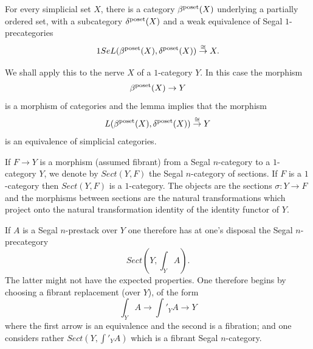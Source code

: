 \begin{lemma}
\label{bdvariant}
For every simplicial set $X$, there is a category
$\beta ^{\rm poset} (X)$ underlying a partially ordered set,
with a subcategory $\delta ^{\rm poset} (X)$ and a
weak equivalence of Segal $1$-precategories
$$
1SeL(\beta ^{\rm poset} (X), \delta ^{\rm poset} (X))
\stackrel{\cong}{\rightarrow}
X.
$$
\end{lemma}
\eop

We shall apply this to the nerve $X$ of a $1$-category $Y$. In this case
the morphism
$$
\beta ^{\rm poset} (X)\rightarrow Y
$$
is a morphism of
categories and the lemma implies that the morphism
$$
L(\beta ^{\rm poset} (X), \delta ^{\rm poset} (X))
\stackrel{\cong}{\rightarrow}
Y
$$
is an equivalence of simplicial categories.





If $F\rightarrow Y$ is a morphism (assumed fibrant) from a
Segal $n$-category to a $1$-category $Y$, we denote by $Sect
(Y,F)$ the
Segal $n$-category of sections. If $F$ is a $1$-category then
$Sect(Y,F)$ is a $1$-category. The objects are the sections $\sigma :
Y\rightarrow F$ and the morphisms between sections are the natural
transformations which project onto the natural transformation
identity of the
identity functor of $Y$.

If $A$ is a Segal $n$-prestack over $Y$ one therefore has at one's disposal
the
Segal
$n$-precategory
$$
Sect(Y, \int _YA).
$$
The latter might not have the expected properties. One therefore begins by
choosing
a fibrant replacement (over $Y$), of the form
$$
\int _YA\rightarrow \int '_YA \rightarrow Y
$$
where the first arrow is an equivalence and the second is
a fibration; and one considers rather $Sect(Y,\int '_YA)$
which is a fibrant Segal $n$-category.


